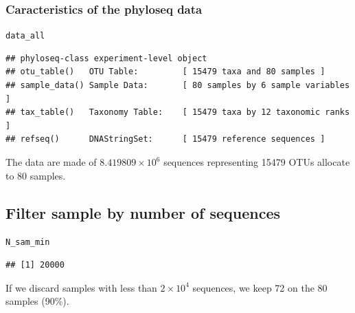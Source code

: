 \documentclass[12pt]{article}\usepackage[]{graphicx}\usepackage[]{color}
\makeatletter
\newcommand{\hlstd}[1]{\textcolor[rgb]{0.345,0.345,0.345}{#1}}%
\newenvironment{kframe}{%
 \def\at@end@of@kframe{}%
 \ifinner\ifhmode%
  \def\at@end@of@kframe{\end{minipage}}%
  \begin{minipage}{\columnwidth}%
 \fi\fi%
 \def\FrameCommand##1{\hskip\@totalleftmargin \hskip-\fboxsep
 \colorbox{shadecolor}{##1}\hskip-\fboxsep
     \hskip-\linewidth \hskip-\@totalleftmargin \hskip\columnwidth}%
 \MakeFramed {\advance\hsize-\width
   \@totalleftmargin\z@ \linewidth\hsize
   \@setminipage}}%
 {\par\unskip\endMakeFramed%
 \at@end@of@kframe}
\newenvironment{knitrout}{}{} %
\numberwithin{figure}{section}
\makeatother
\begin{document}
\subsubsection{Caracteristics of the phyloseq data}
  
\begin{knitrout}\small
{}\color{fgcolor}\begin{kframe}
\begin{alltt}
\hlstd{data_all}
\end{alltt}
\begin{verbatim}
## phyloseq-class experiment-level object
## otu_table()   OTU Table:         [ 15479 taxa and 80 samples ]
## sample_data() Sample Data:       [ 80 samples by 6 sample variables ]
## tax_table()   Taxonomy Table:    [ 15479 taxa by 12 taxonomic ranks ]
## refseq()      DNAStringSet:      [ 15479 reference sequences ]
\end{verbatim}
\end{kframe}
\end{knitrout}

The data are made of \ensuremath{8.419809\times 10^{6}} sequences representing 15479 OTUs allocate to 80 samples.

  \subsection{Filter sample by number of sequences}

\begin{knitrout}\small
{}\color{fgcolor}\begin{kframe}
\begin{alltt}
\hlstd{N_sam_min}
\end{alltt}
\begin{verbatim}
## [1] 20000
\end{verbatim}
\end{kframe}
\end{knitrout}

If we discard samples with less than \ensuremath{2\times 10^{4}} sequences, we keep 72 on the 80 samples (90\%).
\end{document}
